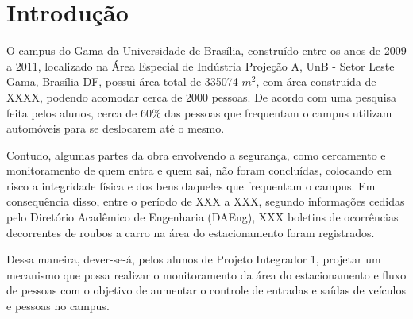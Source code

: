 \chapter{Introdução}
O campus do Gama da Universidade de Brasília, construído entre os anos de 2009 a 2011, localizado na Área Especial de Indústria Projeção A, UnB - Setor Leste Gama, Brasília-DF, possui área total de 335074 $m^2$, com área construída de XXXX, podendo  acomodar cerca de 2000 pessoas.  De acordo com uma pesquisa feita pelos alunos, cerca de 60\% das pessoas que frequentam o campus utilizam automóveis para se deslocarem até o mesmo.

Contudo, algumas partes da obra envolvendo a segurança, como cercamento e monitoramento de quem entra e quem sai, não foram concluídas, colocando em risco a integridade física e dos bens daqueles que frequentam o campus. Em consequência disso, entre o período de XXX a XXX, segundo informações cedidas pelo Diretório Acadêmico de Engenharia (DAEng), XXX boletins de ocorrências decorrentes de roubos a carro na área do estacionamento foram registrados.

Dessa maneira, dever-se-á, pelos alunos de Projeto Integrador 1, projetar  um mecanismo que possa realizar o monitoramento  da área do estacionamento e fluxo de pessoas  com o objetivo de aumentar o controle de entradas e saídas de veículos e pessoas no campus.
